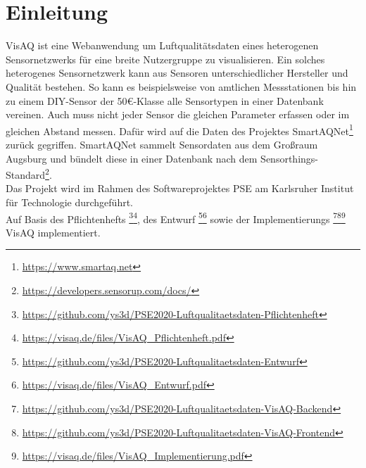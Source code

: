 \section{Einleitung}
VisAQ ist eine Webanwendung um Luftqualitätsdaten eines heterogenen \gls{Sensor}netzwerks für eine breite Nutzergruppe zu visualisieren.
Ein solches heterogenes Sensornetzwerk kann aus Sensoren unterschiedlicher Hersteller und Qualität bestehen.
So kann es beispielsweise von amtlichen Messstationen bis hin zu einem DIY-Sensor der 50\euro-Klasse alle Sensortypen in einer Datenbank vereinen.
Auch muss nicht jeder Sensor die gleichen Parameter erfassen oder im gleichen Abstand messen.
Dafür wird auf die Daten des Projektes SmartAQNet\footnote{\url{https://www.smartaq.net}} zurück gegriffen.
SmartAQNet sammelt Sensordaten aus dem Großraum Augsburg und bündelt diese in einer Datenbank nach dem Sensorthings-Standard\footnote{\url{https://developers.sensorup.com/docs/}}.
\\
Das Projekt wird im Rahmen des Softwareprojektes PSE am Karlsruher Institut für Technologie durchgeführt.
\\
Auf Basis des Pflichtenhefts
\footnote{\url{https://github.com/ys3d/PSE2020-Luftqualitaetsdaten-Pflichtenheft}}\footnote{\url{https://visaq.de/files/VisAQ_Pflichtenheft.pdf}},
des Entwurf
\footnote{\url{https://github.com/ys3d/PSE2020-Luftqualitaetsdaten-Entwurf}}\footnote{\url{https://visaq.de/files/VisAQ_Entwurf.pdf}}
sowie der Implementierungs
\footnote{\url{https://github.com/ys3d/PSE2020-Luftqualitaetsdaten-VisAQ-Backend}}\footnote{\url{https://github.com/ys3d/PSE2020-Luftqualitaetsdaten-VisAQ-Frontend}}\footnote{\url{https://visaq.de/files/VisAQ_Implementierung.pdf}}
VisAQ implementiert.